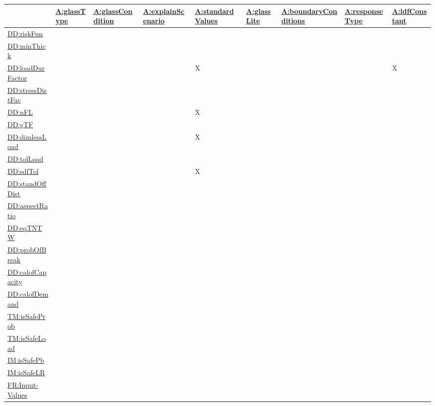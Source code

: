 \documentclass[12pt]{article}
\begin{document}
\begin{longtable}{l l l l l l l l l}
\toprule
\textbf{} & \textbf{\hyperref[assumpGT]{A:glassType}} & \textbf{\hyperref[assumpGC]{A:glassCondition}} & \textbf{\hyperref[assumpES]{A:explainScenario}} & \textbf{\hyperref[assumpSV]{A:standardValues}} & \textbf{\hyperref[assumpGL]{A:glassLite}} & \textbf{\hyperref[assumpBC]{A:boundaryConditions}} & \textbf{\hyperref[assumpRT]{A:responseType}} & \textbf{\hyperref[assumpLDFC]{A:ldfConstant}}
\\
\midrule
\endhead
\hyperref[DD:riskFun]{DD:riskFun} &  &  &  &  &  &  &  & 
\\
\hyperref[DD:minThick]{DD:minThick} &  &  &  &  &  &  &  & 
\\
\hyperref[DD:loadDurFactor]{DD:loadDurFactor} &  &  &  & X &  &  &  & X
\\
\hyperref[DD:stressDistFac]{DD:stressDistFac} &  &  &  &  &  &  &  & 
\\
\hyperref[DD:nFL]{DD:nFL} &  &  &  & X &  &  &  & 
\\
\hyperref[DD:gTF]{DD:gTF} &  &  &  &  &  &  &  & 
\\
\hyperref[DD:dimlessLoad]{DD:dimlessLoad} &  &  &  & X &  &  &  & 
\\
\hyperref[DD:tolLoad]{DD:tolLoad} &  &  &  &  &  &  &  & 
\\
\hyperref[DD:sdfTol]{DD:sdfTol} &  &  &  & X &  &  &  & 
\\
\hyperref[DD:standOffDist]{DD:standOffDist} &  &  &  &  &  &  &  & 
\\
\hyperref[DD:aspectRatio]{DD:aspectRatio} &  &  &  &  &  &  &  & 
\\
\hyperref[DD:eqTNTW]{DD:eqTNTW} &  &  &  &  &  &  &  & 
\\
\hyperref[DD:probOfBreak]{DD:probOfBreak} &  &  &  &  &  &  &  & 
\\
\hyperref[DD:calofCapacity]{DD:calofCapacity} &  &  &  &  &  &  &  & 
\\
\hyperref[DD:calofDemand]{DD:calofDemand} &  &  &  &  &  &  &  & 
\\
\hyperref[TM:isSafeProb]{TM:isSafeProb} &  &  &  &  &  &  &  & 
\\
\hyperref[TM:isSafeLoad]{TM:isSafeLoad} &  &  &  &  &  &  &  & 
\\
\hyperref[IM:isSafePb]{IM:isSafePb} &  &  &  &  &  &  &  & 
\\
\hyperref[IM:isSafeLR]{IM:isSafeLR} &  &  &  &  &  &  &  & 
\\
\hyperref[inputValues]{FR:Input-Values} &  &  &  &  &  &  &  & 

\end{longtable}
\end{document}
